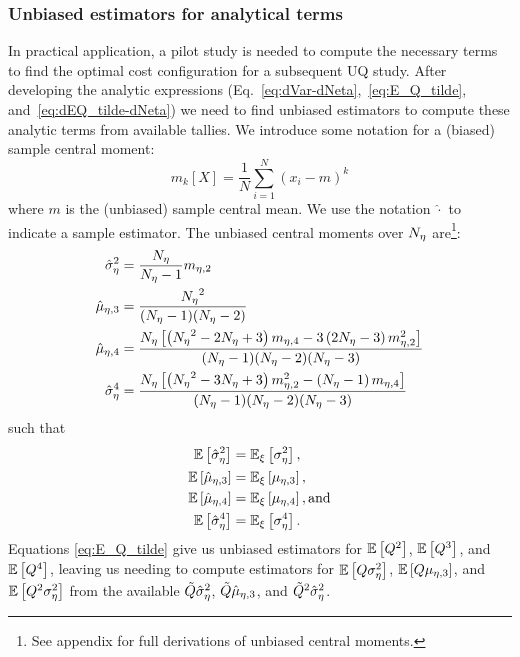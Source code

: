 \subsubsection{Unbiased estimators for analytical terms}
In practical application, a pilot study is needed to compute the necessary terms to find the optimal cost configuration for a subsequent UQ study. After developing the analytic expressions (Eq.~\eqref{eq:dVar-dNeta},~\eqref{eq:E_Q_tilde}, and~\eqref{eq:dEQ_tilde-dNeta}) we need to find unbiased estimators to compute these analytic terms from available tallies. 
We introduce some notation for a (biased) sample central moment:
\begin{equation}
    m_k[X] = \frac{1}{N}\sum_{i=1}^N \left(x_i - m\right)^k
\end{equation}
where $m$ is the (unbiased) sample central mean. We use the notation $\hat{\cdot}$ to indicate a sample estimator. The unbiased central moments over ${N_\eta}$ are\footnote{See appendix for full derivations of unbiased central moments.}:
\begin{equation}
    \begin{split}
        \hat{\sigma}_{\eta}^2 &= \frac{{N_\eta}}{{N_\eta}-1} m_{\eta,2} \\
        \hat{\mu}_{\eta,3} &= \frac{{N_\eta}^2}{({N_\eta}-1)({N_\eta}-2)} \\
        \hat{\mu}_{\eta,4} &= \frac{{N_\eta}\left[ \left({N_\eta}^2 - 2{N_\eta} + 3\right)m_{\eta,4} - 3\left(2{N_\eta}-3\right)m_{\eta,2}^2 \right]}{({N_\eta}-1)({N_\eta}-2)({N_\eta}-3)} \\
        \hat{\sigma}_\eta^4 &= \frac{{N_\eta}\left[ \left({N_\eta}^2 - 3{N_\eta} + 3\right)m_{\eta,2}^2 - \left({N_\eta}-1\right)m_{\eta,4} \right]}{({N_\eta}-1)({N_\eta}-2)({N_\eta}-3)}
    \end{split}
\end{equation} such that 
\begin{equation}
    \begin{split}
        \mathbb{E}\left[\hat{\sigma}_{\eta}^2\right] &= \mathbb{E}_\xi\left[\sigma^2_\eta\right], \\
        \mathbb{E}\left[\hat{\mu}_{\eta,3}\right] &= \mathbb{E}_\xi\left[\mu_{\eta,3}\right], \\
        \mathbb{E}\left[\hat{\mu}_{\eta,4}\right] &= \mathbb{E}_\xi\left[\mu_{\eta,4}\right], \text{and}\\
        \mathbb{E}\left[\hat{\sigma}_\eta^4\right] &= \mathbb{E}_\xi\left[\sigma_\eta^4\right] .
    \end{split}
\end{equation}
Equations \eqref{eq:E_Q_tilde} give us unbiased estimators for $\mathbb{E}\left[Q^2\right]$, $\mathbb{E}\left[Q^3\right]$, and $\mathbb{E}\left[Q^4\right]$, leaving us needing to compute estimators for $\mathbb{E}\left[Q\sigma^2_\eta\right]$, $\mathbb{E}\left[Q\mu_{\eta,3}\right]$, and $\mathbb{E}\left[Q^2\sigma^2_\eta\right]$ from the available $\tilde{Q} \hat{\sigma}^2_\eta$, $\tilde{Q} \hat{\mu}_{\eta,3}$, and $\tilde{Q}^2 \hat{\sigma}^2_\eta$. %
